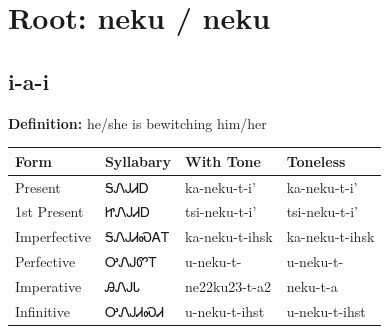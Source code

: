 \documentclass{article}%
\begin{document}
%
\normalsize%
\section*{Root: neku / neku}%
\subsection*{i-a-i}%
\textbf{Definition: }%
he/she is bewitching him/her%
\\[0.5em]%
\begin{tabular}{|l|l|l|l|}%
\hline%
\textbf{Form}&\textbf{Syllabary}&\textbf{With Tone}&\textbf{Toneless}\\%
\hline%
Present&ᎦᏁᎫᏗᎠ&ka{-}neku{-}t{-}i'&ka{-}neku{-}t{-}i'\\%
1st Present&ᏥᏁᎫᏗᎠ&tsi{-}neku{-}t{-}i'&tsi{-}neku{-}t{-}i'\\%
Imperfective&ᎦᏁᎫᏗᏍᎪᎢ&ka{-}neku{-}t{-}ihsk&ka{-}neku{-}t{-}ihsk\\%
Perfective&ᎤᏁᎫᏛᎢ&u{-}neku{-}t{-}&u{-}neku{-}t{-}\\%
Imperative&ᎯᏁᎫᏓ&ne22ku23{-}t{-}a2&neku{-}t{-}a\\%
Infinitive&ᎤᏁᎫᏗᏍᏗ&u{-}neku{-}t{-}ihst&u{-}neku{-}t{-}ihst\\%
\hline%
\end{tabular}%
\\[1em]%
\end{document}

